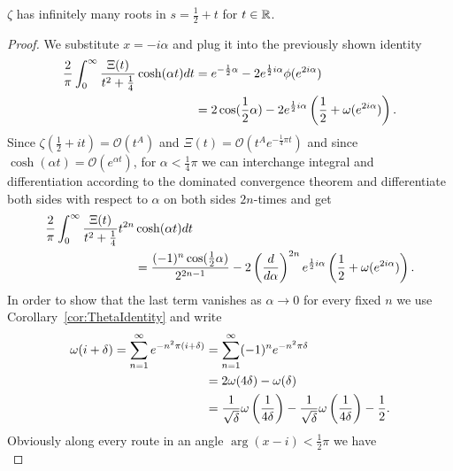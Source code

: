 \begin{theorem}
	$\zeta$ has infinitely many roots in $s = \frac{1}{2} + t$ for $t \in \mathbb{R}$.
\end{theorem}
\begin{proof}
	We substitute $x = -i \alpha$ and plug it into the previously shown identity
\begin{equation*}
\begin{aligned}
	\frac{2}{\pi} \int _0 ^{\infty} \frac{\Xi(t)}{t^2 + \frac{1}{4}} \cosh(\alpha t) dt 
	&= e^{-\frac{1}{2} \alpha} - 2e^{\frac{1}{2} i \alpha} \phi(e^{2 i \alpha}) \\
	&= 2 \cos(\frac{1}{2} \alpha) - 2e^{\frac{1}{2} i \alpha} \left(\frac{1}{2} + \omega(e^{2 i \alpha})\right).
\end{aligned}
\end{equation*}
	Since $\zeta(\frac{1}{2} + it) = \mathcal{O}(t^A)$ and $\Xi(t) = \mathcal{O}(t^A e^{-\frac{1}{4} \pi t})$ and since $\cosh(\alpha t) = \mathcal{O}(e^{\alpha t})$, for $\alpha < \frac{1}{4} \pi$ we can interchange integral and differentiation according to the dominated convergence theorem and differentiate both sides with respect to $\alpha$ on both sides $2n$-times and get
\begin{equation*}
\begin{aligned}	
	\frac{2}{\pi} \int _0 ^{\infty} \frac{\Xi(t)}{t^2 + \frac{1}{4}} t^{2n}
		&\cosh(\alpha t) dt \\
		&= \frac{(-1)^{n} \cos(\frac{1}{2} \alpha)}{2^{2n - 1}} - 2 \left(\frac{d}{d\alpha}\right)^{2n}e^{\frac{1}{2} i \alpha} \left(\frac{1}{2} + \omega(e^{2 i \alpha})\right).
\end{aligned}
\end{equation*}
	In order to show that the last term vanishes as $\alpha \to 0$ for every fixed $n$ we use Corollary~\ref{cor:ThetaIdentity} and write
\begin{equation*}
\begin{aligned}
	\omega(i + \delta) = \sum _{n=1} ^{\infty} e^{-n^2 \pi (i + \delta)}
		&= \sum _{n=1} ^{\infty} (-1)^n e^{-n^2 \pi \delta} \\
		&= 2 \omega(4 \delta) - \omega(\delta) \\
		&= \frac{1}{\sqrt \delta} \omega\left(\frac{1}{4\delta}\right) - \frac{1}{\sqrt \delta} \omega\left(\frac{1}{4\delta}\right) - \frac{1}{2}.
\end{aligned}
\end{equation*}
	Obviously along every route in an angle $\arg(x - i) < \frac{1}{2} \pi$ we have
\begin{equation*}

\end{equation*}
\end{proof}
